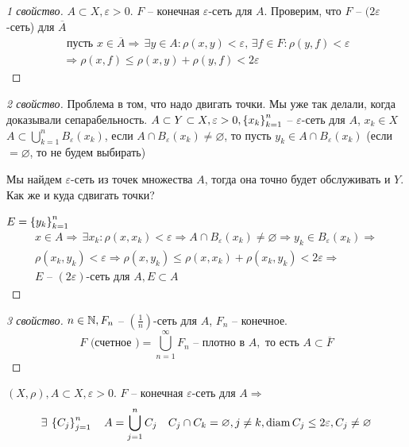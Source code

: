 \documentclass[document]{subfiles}
\begin{document}
\begin{proof}[1 свойство]
    $A \subset X, \varepsilon > 0$. $F$ -- конечная $\varepsilon$-сеть для $A$. Проверим, что
    $F$ -- $(2\varepsilon$-сеть) для $\overline{A}$
    \begin{gather*}
        \text{ пусть } x \in \overline{A} \Rightarrow \, \exists y \in A: \rho(x,y) < \varepsilon, \, \exists f \in F: \rho(y,f) < \varepsilon \\
        \Rightarrow \rho(x,f) \leq \rho(x,y) + \rho(y,f) < 2\varepsilon
    \end{gather*}
\end{proof}

\begin{proof}[2 свойство]
    Проблема в том, что надо двигать точки. Мы уже так делали, когда доказывали сепарабельность.
    $A \subset Y \subset X, \varepsilon > 0, \left\{x_k\right\}^n_{k=1}$ -- $\varepsilon$-сеть для $A$, $x_k \in X$ \\
    $A \subset \bigcup^n_{k=1} B_\varepsilon(x_k)$, если $A \cap B_\varepsilon(x_k) \ne \varnothing$, то
    пусть $y_k \in A \cap B_\varepsilon(x_k)$ (если $=\varnothing$, то не будем выбирать)

    Мы найдем $\varepsilon$-сеть из точек множества $A$, тогда она точно будет обслуживать и $Y$. Как же и куда сдвигать точки?

    $E = \left\{y_k\right\}^n_{k=1}$ 
    \begin{multline*}
        x \in A \Rightarrow \, \exists x_k : \rho(x,x_k) < \varepsilon \Rightarrow A \cap B_{\varepsilon}(x_k) \ne \varnothing \Rightarrow y_k \in B_{\varepsilon}(x_k) \Rightarrow \\
        \rho(x_k,y_k) < \varepsilon \Rightarrow \rho(x,y_k) \leq \rho(x,x_k) + \rho(x_k, y_k) < 2\varepsilon \Rightarrow \\
        E \text{ -- } (2\varepsilon)\text{-сеть для } A, E \subset A
    \end{multline*}
\end{proof}

\begin{proof}[3 свойство]
    $n \in \mathbb{N}, F_n$ -- $\left( \frac{1}{n} \right)$-сеть для $A$, $F_n$ -- конечное.
    \[ F \text{ (счетное )} = \bigcup^\infty_{n=1} F_n \text{ -- плотно в } A, \text{ то есть } A \subset \overline{F} \]
\end{proof}

\begin{statement}[о разбиении]
    $(X, \rho), A \subset X, \varepsilon > 0$. $F$ -- конечная $\varepsilon$-сеть для $A \Rightarrow$ 
    \[ \exists \seq{C_j}^n_{j=1} \quad A = \bigcup^n_{j=1} C_j \quad C_j \cap C_k = \varnothing, j \ne k, \diam C_j \leq 2 \varepsilon, C_j \ne \varnothing \]

\end{statement}
\end{document}
